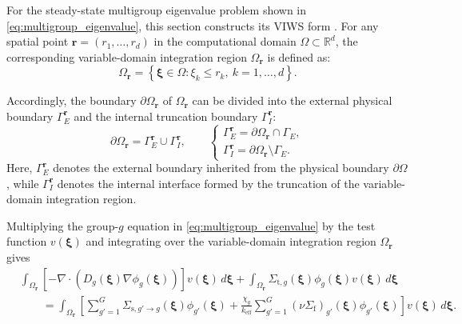 \documentclass[final,3p,times,sort&compress]{elsarticle}
\begin{document}
For the steady-state multigroup eigenvalue problem shown in \cref{eq:multigroup_eigenvalue}, this section constructs its VIWS form \cite{liu2026variabledomain}. For any spatial point $\boldsymbol{r} = (r_1, \ldots, r_d)$ in the computational domain $\Omega \subset \mathbb{R}^d$, the corresponding variable-domain integration region $\Omega_{\boldsymbol{r}}$ is defined as:
\begin{equation}
    \Omega_{\boldsymbol{r}}
    =
    \left\{
    \boldsymbol \xi \in \Omega :
    \xi_k \leq r_k,\ k=1,\ldots,d
    \right\}.
    \label{eq:multigroup_variable_domain}
\end{equation}

Accordingly, the boundary $\partial \Omega_{\boldsymbol{r}}$ of $\Omega_{\boldsymbol{r}}$ can be divided into the external physical boundary $\Gamma_E^{\boldsymbol{r}}$ and the internal truncation boundary $\Gamma_I^{\boldsymbol{r}}$:
\begin{equation}
\partial \Omega_{\boldsymbol{r}} = \Gamma_E^{\boldsymbol r} \cup \Gamma_I^{\boldsymbol r},
\qquad
\left\{
\begin{array}{l}
\Gamma_E^{\boldsymbol r} = \partial \Omega_{\boldsymbol r} \cap \Gamma_E, \\
\Gamma_I^{\boldsymbol r} = \partial \Omega_{\boldsymbol r} \setminus \Gamma_E.
\end{array}\right.
\label{eq:multigroup_boundary_decomposition}
\end{equation}
Here, $\Gamma_E^{\boldsymbol r}$ denotes the external boundary inherited from the physical boundary $\partial\Omega$, while $\Gamma_I^{\boldsymbol r}$ denotes the internal interface formed by the truncation of the variable-domain integration region.

Multiplying the group-$g$ equation in \cref{eq:multigroup_eigenvalue} by the test function $v(\boldsymbol \xi)$ and integrating over the variable-domain integration region $\Omega_{\boldsymbol r}$ gives
\begin{equation}
\begin{aligned}
    & \int_{\Omega_{\boldsymbol r}}
    \left[
    -\nabla \cdot
    \left(
    D_g(\boldsymbol \xi)\nabla \phi_g(\boldsymbol \xi)
    \right)
    \right]
    v(\boldsymbol \xi)\,d\boldsymbol \xi
    +
    \int_{\Omega_{\boldsymbol r}}
    \Sigma_{\mathrm{t},g}(\boldsymbol \xi)
    \phi_g(\boldsymbol \xi)
    v(\boldsymbol \xi)\,d\boldsymbol \xi
    \\
    & \qquad =
    \int_{\Omega_{\boldsymbol r}}
    \left[
    \sum_{g'=1}^{G}
    \Sigma_{\mathrm{s},g'\to g}(\boldsymbol \xi)
    \phi_{g'}(\boldsymbol \xi)
    +
    \frac{\chi_g}{k_{\mathrm{eff}}}
    \sum_{g'=1}^{G}
    \left(\nu\Sigma_{\mathrm{f}}\right)_{g'}(\boldsymbol \xi)
    \phi_{g'}(\boldsymbol \xi)
    \right]
    v(\boldsymbol \xi)\,d\boldsymbol \xi .
\end{aligned}
\label{eq:multigroup_variable_integral}
\end{equation}
\end{document}
